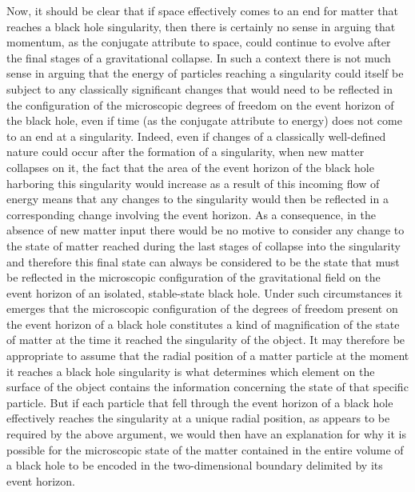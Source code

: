 \documentclass[notitlepage,12pt]{report}
\begin{document}
Now, it should be clear that if space effectively comes to an end for matter that reaches a black hole singularity, then there is certainly no sense in arguing that momentum, as the conjugate attribute to space, could continue to evolve after the final stages of a gravitational collapse. In such a context there is not much sense in arguing that the energy of particles reaching a singularity could itself be subject to any classically significant changes that would need to be reflected in the configuration of the microscopic degrees of freedom on the event horizon of the black hole, even if time (as the conjugate attribute to energy) does not come to an end at a singularity. Indeed, even if changes of a classically well-defined nature could occur after the formation of a singularity, when new matter collapses on it, the fact that the area of the event horizon of the black hole harboring this singularity would increase as a result of this incoming flow of energy means that any changes to the singularity would then be reflected in a corresponding change involving the event horizon. As a consequence, in the absence of new matter input there would be no motive to consider any change to the state of matter reached during the last stages of collapse into the singularity and therefore this final state can always be considered to be the state that must be reflected in the microscopic configuration of the gravitational field on the event horizon of an isolated, stable-state black hole. Under such circumstances it emerges that the microscopic configuration of the degrees of freedom present on the event horizon of a black hole constitutes a kind of magnification of the state of matter at the time it reached the singularity of the object. It may therefore be appropriate to assume that the radial position of a matter particle at the moment it reaches a black hole singularity is what determines which element on the surface of the object contains the information concerning the state of that specific particle. But if each particle that fell through the event horizon of a black hole effectively reaches the singularity at a unique radial position, as appears to be required by the above argument, we would then have an explanation for why it is possible for the microscopic state of the matter contained in the entire volume of a black hole to be encoded in the two-dimensional boundary delimited by its event horizon.
\end{document}
